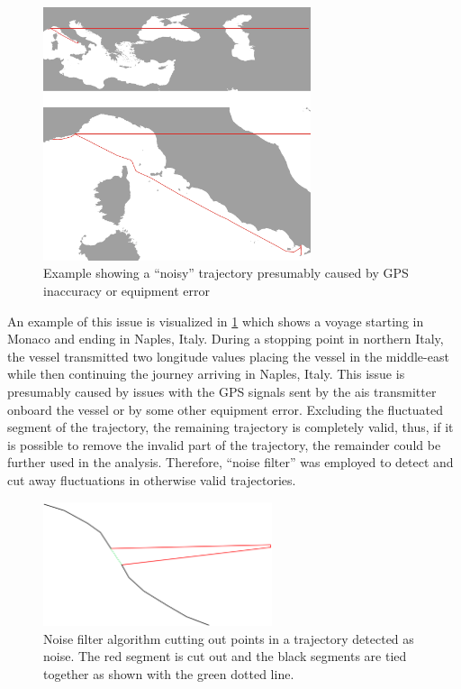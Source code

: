 \begin{figure}[htbp]  %
    \centering
    \includegraphics[width=0.7\textwidth]{figures/trajectory_noise/noisy_trajectory}
    \caption{Example showing a ``noisy'' trajectory presumably caused by GPS inaccuracy or equipment error}
    \label{fig:noisy_trajectory}
\end{figure}

An example of this issue is visualized in \cref{fig:noisy_trajectory} which shows a voyage starting in Monaco and ending in Naples, Italy. During a stopping point in northern Italy, the vessel transmitted two longitude values placing the vessel in the middle-east while then continuing the journey arriving in Naples, Italy. This issue is presumably caused by issues with the GPS signals sent by the \acrshort{ais} transmitter onboard the vessel or by some other equipment error. Excluding the fluctuated segment of the trajectory, the remaining trajectory is completely valid, thus, if it is possible to remove the invalid part of the trajectory, the remainder could be further used in the analysis. Therefore, ``noise filter'' was employed to detect and cut away fluctuations in otherwise valid trajectories.

\begin{figure}[htbp]  %
    \centering
    \includegraphics[width=0.6\textwidth]{figures/trajectory_noise/noise_filter}
    \caption{Noise filter algorithm cutting out points in a trajectory detected as noise. The red segment is cut out and the black segments are tied together as shown with the green dotted line.}
    \label{fig:noise_filter}
\end{figure}

